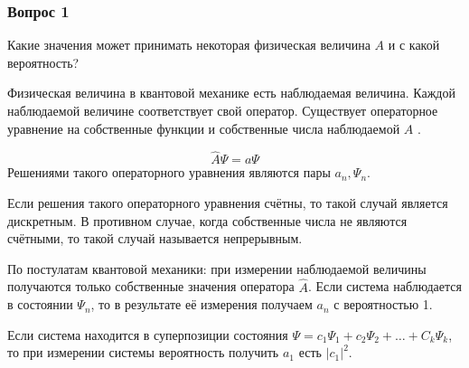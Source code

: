 \subsubsection{Вопрос 1}

Какие значения может принимать некоторая физическая величина $A$ и с какой вероятность?

Физическая величина в квантовой механике есть наблюдаемая величина. Каждой наблюдаемой величине соответствует свой оператор. Существует операторное уравнение на собственные функции и собственные числа наблюдаемой $A$ .

$$\hat{A}\Psi=a\Psi$$
Решениями такого операторного уравнения являются пары $a_n,\Psi_n$. 

Если решения такого операторного уравнения счётны, то такой случай является дискретным. В противном случае, когда собственные числа не являются счётными, то такой случай называется непрерывным.

По постулатам квантовой механики: при измерении наблюдаемой величины получаются только собственные значения оператора $\hat{A}$. Если система наблюдается в состоянии $\Psi_n$,  то в результате её измерения получаем $a_n$ с вероятностью 1.

Если система находится в суперпозиции состояния $\Psi=c_1\Psi_1+c_2\Psi_2+\dots+C_k\Psi_k$, то при измерении системы вероятность получить $a_1$ есть $|c_1|^2$.
